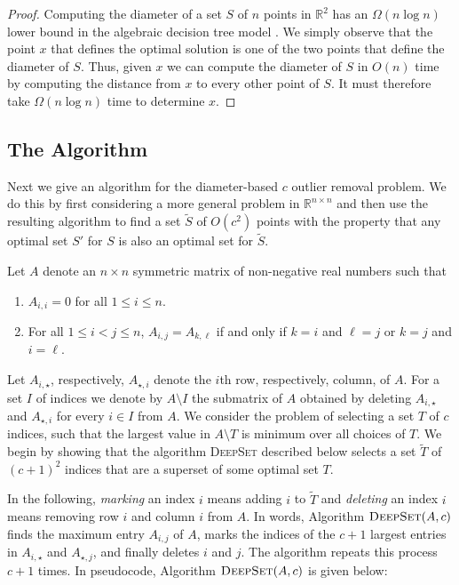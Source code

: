 \documentclass[lotsofwhite]{patmorin}
\begin{document}
\begin{proof}
Computing the diameter of a set $S$ of $n$ points in $\mathbb{R}^2$
has an $\Omega(n\log n)$ lower bound in the algebraic decision tree
model \cite{ps85}.  We simply observe that the point $x$ that defines
the optimal solution is one of the two points that define the diameter
of $S$. Thus, given $x$ we can compute the diameter of $S$ in $O(n)$
time by computing the distance from $x$ to every other point of $S$.
It must therefore take $\Omega(n\log n)$ time to determine $x$. 
\end{proof}


\subsection{The Algorithm}

Next we give an algorithm for the diameter-based $c$ outlier removal
problem.  We do this by first considering a more general problem in
$\mathbb{R}^{n \times n}$ and then use the resulting algorithm to find
a set $\tilde{S}$ of $O(c^2)$ points with the property that any
optimal set $S'$ for $S$ is also an optimal set for $\tilde{S}$. 

Let $A$ denote an $n\times n$ symmetric matrix of non-negative real
numbers such that 
\begin{enumerate}
\item $A_{i,i} = 0$ for all $1\le i\le n$.

\item For all $1\le i<j\le n$, 
     $A_{i,j} = A_{k,\ell}$ if and only if $k=i$ and 
     $\ell=j$ or $k=j$ and $i=\ell$.
\end{enumerate}
Let $A_{i,\star}$, respectively, $A_{\star,i}$ denote the $i$th row,
respectively, column, of $A$.  For a set $I$ of indices we denote by
$A\setminus I$ the submatrix of $A$ obtained by deleting $A_{i,\star}$
and $A_{\star,i}$ for every $i\in I$ from $A$.  We consider the
problem of selecting a set $T$ of $c$ indices, such that the largest
value in $A\setminus T$ is minimum over all choices of $T$.  We begin
by showing that the algorithm \textsc{DeepSet} described below selects
a set $\tilde{T}$ of $(c+1)^2$ indices that are a superset of some
optimal set $T$.

In the following, \emph{marking} an index $i$ means adding $i$ to
$\tilde{T}$ and \emph{deleting} an index $i$ means removing row $i$
and column $i$ from $A$.  In words, Algorithm $\textsc{DeepSet}(A,c)$
finds the maximum entry $A_{i,j}$ of $A$, marks the indices of the
$c+1$ largest entries in $A_{i,\star}$ and $A_{\star,j}$, and finally deletes
$i$ and $j$.  The algorithm repeats this process $c+1$ times.  In
pseudocode, Algorithm $\textsc{DeepSet}(A,c)$ is given 
below:
\end{document}
